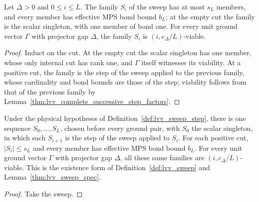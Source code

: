 \begin{lemma}
    \label{thm:lvv_sweep_spec}
    \leanok
    Let $\Delta>0$ and $0\le i\le L$. The family $S_i$ of the sweep has at most
    $s_L$ members, and every member has effective MPS bond bound $b_L$; at the
    empty cut the family is the scalar singleton, with one member of bond one.
    For every unit ground vector $\Gamma$ with projector gap $\Delta$, the
    family $S_i$ is $(i,c_\Delta/L)$-viable.
\end{lemma}
\begin{proof}
    \leanok
    Induct on the cut. At the empty cut the scalar singleton has one member,
    whose only internal cut has rank one, and $\Gamma$ itself witnesses its
    viability. At a positive cut, the family is the step of the sweep applied
    to the previous family, whose cardinality and bond bounds are those of the
    step; viability follows from that of the previous family by
    Lemma~\ref{thm:lvv_complete_successive_step_factors}.
\end{proof}

\begin{lemma}
    \label{thm:lvv_coherent_successive_sequence}
    \leanok
    Under the physical hypotheses of Definition~\ref{def:lvv_sweep_step},
    there is one sequence $S_0,\ldots,S_L$, chosen before every ground pair,
    with $S_0$ the scalar singleton, in which each $S_{i+1}$ is the step of
    the sweep applied to $S_i$. For each positive cut, $|S_i|\le s_L$ and
    every member has effective MPS bond bound $b_L$. For every unit ground
    vector $\Gamma$ with projector gap $\Delta$, all these same families are
    $(i,c_\Delta/L)$-viable. This is the existence form of
    Definition~\ref{def:lvv_sweep} and Lemma~\ref{thm:lvv_sweep_spec}.
\end{lemma}
\begin{proof}
    \leanok
    Take the sweep.
\end{proof}


